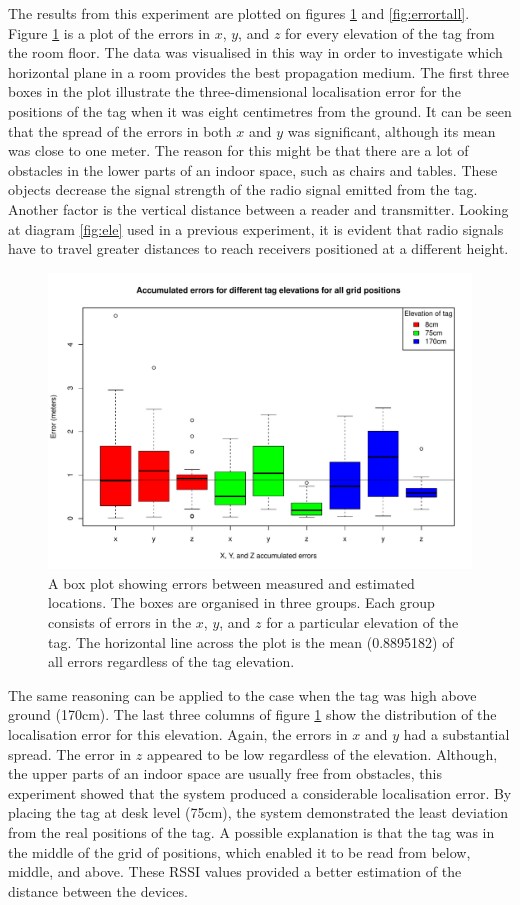 The results from this experiment are plotted on figures \ref{fig:errorbox3d} and \ref{fig:errortall}. Figure \ref{fig:errorbox3d} is a plot of the errors in $x$, $y$, and $z$ for every elevation of the tag from the room floor. The data was visualised in this way in order to investigate which horizontal plane in a room provides the best propagation medium. The first three boxes in the plot illustrate the three-dimensional localisation error for the positions of the tag when it was eight centimetres from the ground. It can be seen that the spread of the errors in both $x$ and $y$ was significant, although its mean was close to one meter. The reason for this might be that there are a lot of obstacles in the lower parts of an indoor space, such as chairs and tables. These objects decrease the signal strength of the radio signal emitted from the tag. Another factor is the vertical distance between a reader and transmitter. Looking at diagram \ref{fig:ele} used in a previous experiment, it is evident that radio signals have to travel greater distances to reach receivers positioned at a different height.
\begin{figure}[H]
	\begin{center}
		\includegraphics[width=.8\textwidth]{figures/error_boxplot_3d}
		\caption{A box plot showing errors between measured and estimated locations. The boxes are organised in three groups. Each group consists of errors in the $x$, $y$, and $z$ for a particular elevation of the tag. The horizontal line across the plot is the mean (0.8895182) of all errors regardless of the tag elevation.}
		\label{fig:errorbox3d}
	\end{center}
\end{figure}
The same reasoning can be applied to the case when the tag was high above ground (170cm). The last three columns of figure \ref{fig:errorbox3d} show the distribution of the localisation error for this elevation. Again, the errors in $x$ and $y$ had a substantial spread. The error in $z$ appeared to be low regardless of the elevation. Although, the upper parts of an indoor space are usually free from obstacles, this experiment showed that the system produced a considerable localisation error. By placing the tag at desk level (75cm), the system demonstrated the least deviation from the real positions of the tag. A possible explanation is that the tag was in the middle of the grid of positions, which enabled it to be read from below, middle, and above. These RSSI values provided a better estimation of the distance between the devices.
